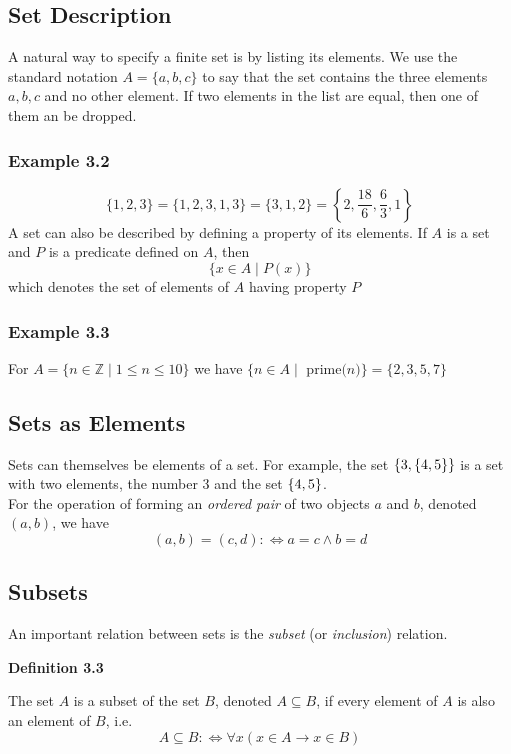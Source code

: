 \documentclass[a4paper]{report}
\newenvironment{definition}[1]{\begin{framed}\centerline{\textbf{Definition #1}}\noindent\hspace{-1.1mm}}{\end{framed}}
\newcommand{\Z}{\mathbb{Z}}
\DeclarePairedDelimiter\cur{\{}{\}}
\begin{document}
\subsection{Set Description}
A natural way to specify a finite set is by listing its elements. We use the standard notation $A=\{a,b,c\}$ to say that the set contains the three elements $a,b,c$ and no other element. If two elements in the list are equal, then one of them an be dropped. 

\subsubsection*{Example 3.2}
\[\{1,2,3\}=\{1,2,3,1,3\}=\{3,1,2\}=\left\{2,\frac{18}{6},\frac{6}{3},1\right\}\]
A set can also be described by defining a property of its elements. If $A$ is a set and $P$ is a predicate defined on $A$, then \[\{x\in A\mid P(x)\}\] which denotes the set of elements of $A$ having property $P$

\subsubsection*{Example 3.3}
For $A=\{n\in\Z\mid 1\leq n\leq 10\}$ we have $\{n\in A\mid\text{ prime($n$)}\}=\{2,3,5,7\}$

\subsection{Sets as Elements}
Sets can themselves be elements of a set. For example, the set $\cur{3,\cur{4,5}}$ is a set with two elements, the number 3 and the set $\cur{4,5}$.\\

For the operation of forming an \emph{ordered pair} of two objects $a$ and $b$, denoted $(a,b)$, we have \[(a,b)=(c,d):\Longleftrightarrow a=c\land b=d\]

\subsection{Subsets}
An important relation between sets is the \emph{subset} (or \emph{inclusion}) relation.

\begin{definition}{3.3}
The set $A$ is a subset of the set $B$, denoted $A\subseteq B$, if every element of $A$ is also an element of $B$, i.e. \[A\subseteq B:\Longleftrightarrow\forall x(x\in A\to x\in B)\]
\end{definition}
\end{document}
